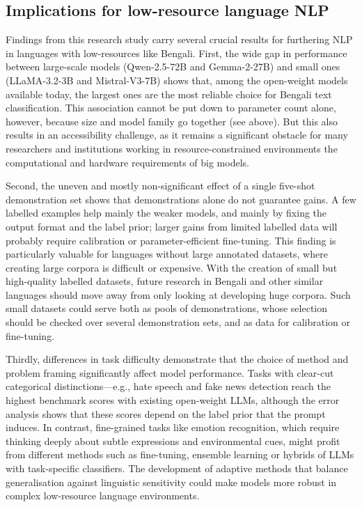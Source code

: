 \documentclass[10pt,letterpaper]{article}
\begin{document}
\subsection*{Implications for low-resource language NLP}

Findings from this research study carry several crucial results for furthering NLP in languages with low-resources like Bengali. First, the wide gap in performance between large-scale models (Qwen-2.5-72B and Gemma-2-27B) and small ones (LLaMA-3.2-3B and Mistral-V3-7B) shows that, among the open-weight models available today, the largest ones are the most reliable choice for Bengali text classification. This association cannot be put down to parameter count alone, however, because size and model family go together (see above). But this also results in an accessibility challenge, as it remains a significant obstacle for many researchers and institutions working in resource-constrained environments the computational and hardware requirements of big models.

Second, the uneven and mostly non-significant effect of a single five-shot demonstration set shows that demonstrations alone do not guarantee gains. A few labelled examples help mainly the weaker models, and mainly by fixing the output format and the label prior; larger gains from limited labelled data will probably require calibration or parameter-efficient fine-tuning. This finding is particularly valuable for languages without large annotated datasets, where creating large corpora is difficult or expensive. With the creation of small but high-quality labelled datasets, future research in Bengali and other similar languages should move away from only looking at developing huge corpora. Such small datasets could serve both as pools of demonstrations, whose selection should be checked over several demonstration sets, and as data for calibration or fine-tuning.

Thirdly, differences in task difficulty demonstrate that the choice of method and problem framing significantly affect model performance. Tasks with clear-cut categorical distinctions—e.g., hate speech and fake news detection reach the highest benchmark scores with existing open-weight LLMs, although the error analysis shows that these scores depend on the label prior that the prompt induces. In contrast, fine-grained tasks like emotion recognition, which require thinking deeply about subtle expressions and environmental cues, might profit from different methods such as fine-tuning, ensemble learning or hybrids of LLMs with task-specific classifiers. The development of adaptive methods that balance generalisation against linguistic sensitivity could make models more robust in complex low-resource language environments.
\end{document}
